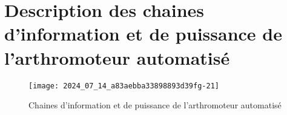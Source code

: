 \section{Description des chaines d'information et de puissance de l'arthromoteur automatisé}

\begin{figure}[!h]\centering
\texttt{[image: 2024\_07\_14\_a83aebba33898893d39fg-21]}
\caption{\label{fig:ccs_mp_2024:fig:33}Chaines d'information et de puissance de l'arthromoteur automatisé}
\end{figure}
